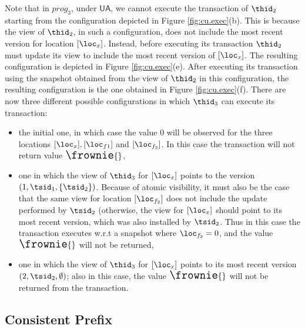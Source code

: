 Note that in $prog_3$, under $\mathsf{UA}$, 
we cannot execute the transaction of $\thid_2$ starting from 
the configuration depicted in Figure \ref{fig:cu.exec}(b). This 
is because the view of $\thid_2$, in such a configuration, does 
not include the most recent version for location $[\loc_x]$. 
Instead, before executing its transaction $\thid_2$ must update 
its view to include the most recent version of $[\loc_x]$. The 
resulting configuration is depicted in Figure \ref{fig:cu.exec}(e). 
After executing its transaction using the snapshot obtained 
from the view of $\thid_2$ in this configuration, the resulting 
configuration is the one obtained in Figure \ref{fig:cu.exec}(f). 
There are now three different possible configurations in which 
$\thid_3$ can execute its transaction: 
\begin{itemize}
\item the initial one, in which case the value $0$ will be observed 
for the three locations $[\loc_x], [\loc_{f1}]$ and $[\loc_{f_2}]$. 
In this case the transaction will not return value ${\Large \frownie{}}$, 
\item one in which the view of $\thid_3$ for $[\loc_x]$ points to the 
version $(1, \tsid_1, \{\tsid_2\})$. Because of atomic visibility, 
it must also be the case that the same view for location $[\loc_{f_2}]$ 
does not include the update performed by $\tsid_2$ (otherwise, 
the view for $[\loc_x]$ should point to its most recent version, which 
was also installed by $\tsid_2$. Thus in this case the transaction executes 
w.r.t a snapshot where $\loc_{f_2} = 0$, and the value ${\Large \frownie{}}$ 
will not be returned, 
\item one in which the view of $\thid_3$ for $[\loc_x]$ points to 
its most recent version $(2, \tsid_2, \emptyset)$; also in this case, 
the value ${\Large \frownie{}}$ will not be returned from the transaction.
\end{itemize}


\subsection{Consistent Prefix} 


